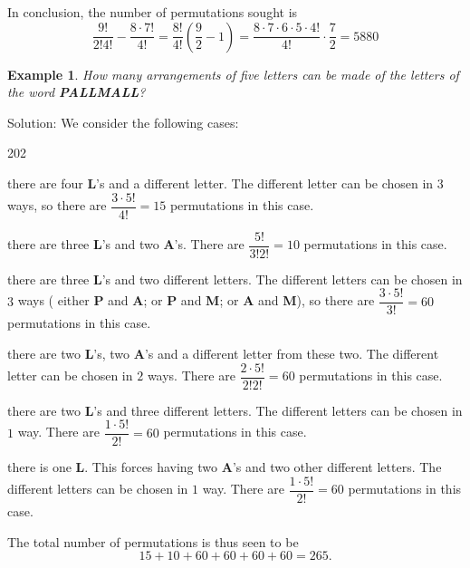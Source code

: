 \documentclass[11pt, openany]{book}
\theoremstyle{change} \theoremheaderfont{\blue\sffamily\bfseries}
\newtheorem{exa}[thm]{Example}
\theoremstyle{nonumberplain} \theoremheaderfont{\sffamily\bfseries}
\newcommand{\í}{\'{\i}}
\begin{document}
\bigskip

In conclusion, the number of permutations sought is
$$ \dfrac{9!}{2!4!} - \dfrac{8\cdot 7!}{4!} = \dfrac{8!}{4!}\left(\dfrac{9}{2} -1\right) = \dfrac{8\cdot 7\cdot 6 \cdot 5 \cdot 4!}{4!}\cdot\dfrac{7}{2}  = 5880 $$



\begin{exa}
How many arrangements of five letters can be made of the letters of
the word {\bf PALLMALL}?
\end{exa}
Solution: We consider the following cases:
\begin{dingautolist}{202}
\item there are four {\bf L}'s and a different letter. The
different letter can be chosen in $3$ ways, so there are
$\dfrac{3\cdot 5!}{4!} = 15$ permutations in this case. \item there
are three {\bf L}'s and two {\bf A}'s. There are $\dfrac{5!}{3!2!} =
10$ permutations in this case. \item there are three {\bf L}'s and
two different letters. The different letters can be chosen in $3$
ways ( either {\bf P} and {\bf A}; or {\bf P} and {\bf M}; or {\bf
A} and {\bf M}), so there are $\dfrac{3\cdot 5!}{3!} = 60$
permutations in this case. \item there are two {\bf L}'s, two {\bf
A}'s and a different letter from these two. The different letter can
be chosen in $2$ ways. There are $\dfrac{2\cdot 5!}{2!2!} = 60$
permutations in this case. \item there are two {\bf L}'s and three
different letters. The different letters can be chosen in $1$ way.
There are $\dfrac{1\cdot 5!}{2!} = 60$ permutations in this case.
\item there is one  {\bf L}. This forces having two {\bf A}'s and
two other different letters. The different letters can be chosen in
$1$ way. There are $\dfrac{1\cdot 5!}{2!} = 60$ permutations in this
case.

\end{dingautolist}
The total number of permutations is thus seen to be
$$15 + 10 + 60 + 60 + 60 + 60 = 265.   $$
\end{document}
